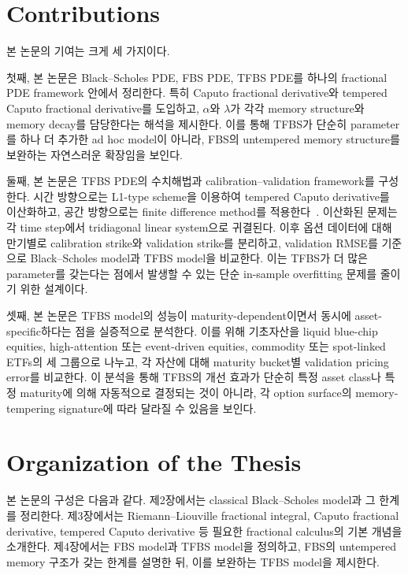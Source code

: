 \documentclass[11pt,a4paper]{report}
\begin{document}
\section{Contributions}

본 논문의 기여는 크게 세 가지이다.

첫째, 본 논문은 Black--Scholes PDE, FBS PDE, TFBS PDE를 하나의 fractional PDE framework 안에서 정리한다. 특히 Caputo fractional derivative와 tempered Caputo fractional derivative를 도입하고, $\alpha$와 $\lambda$가 각각 memory structure와 memory decay를 담당한다는 해석을 제시한다. 이를 통해 TFBS가 단순히 parameter를 하나 더 추가한 ad hoc model이 아니라, FBS의 untempered memory structure를 보완하는 자연스러운 확장임을 보인다.

둘째, 본 논문은 TFBS PDE의 수치해법과 calibration--validation framework를 구성한다. 시간 방향으로는 L1-type scheme을 이용하여 tempered Caputo derivative를 이산화하고, 공간 방향으로는 finite difference method를 적용한다~\cite{SabzikarMeerschaertChen2015}. 이산화된 문제는 각 time step에서 tridiagonal linear system으로 귀결된다. 이후 옵션 데이터에 대해 만기별로 calibration strike와 validation strike를 분리하고, validation RMSE를 기준으로 Black--Scholes model과 TFBS model을 비교한다. 이는 TFBS가 더 많은 parameter를 갖는다는 점에서 발생할 수 있는 단순 in-sample overfitting 문제를 줄이기 위한 설계이다.

셋째, 본 논문은 TFBS model의 성능이 maturity-dependent이면서 동시에 asset-specific하다는 점을 실증적으로 분석한다. 이를 위해 기초자산을 liquid blue-chip equities, high-attention 또는 event-driven equities, commodity 또는 spot-linked ETFs의 세 그룹으로 나누고, 각 자산에 대해 maturity bucket별 validation pricing error를 비교한다. 이 분석을 통해 TFBS의 개선 효과가 단순히 특정 asset class나 특정 maturity에 의해 자동적으로 결정되는 것이 아니라, 각 option surface의 memory-tempering signature에 따라 달라질 수 있음을 보인다.

\section{Organization of the Thesis}

본 논문의 구성은 다음과 같다. 제2장에서는 classical Black--Scholes model과 그 한계를 정리한다. 제3장에서는 Riemann--Liouville fractional integral, Caputo fractional derivative, tempered Caputo derivative 등 필요한 fractional calculus의 기본 개념을 소개한다. 제4장에서는 FBS model과 TFBS model을 정의하고, FBS의 untempered memory 구조가 갖는 한계를 설명한 뒤, 이를 보완하는 TFBS model을 제시한다.
\end{document}
